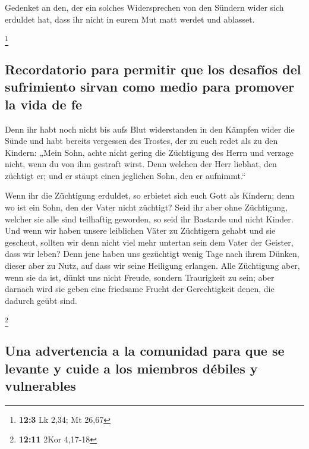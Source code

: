  Gedenket an den, der ein solches Widersprechen von den
Sündern wider sich erduldet hat, dass ihr nicht in eurem Mut matt werdet
und ablasset.

\footnote{\textbf{12:3} Lk 2,34; Mt 26,67}

\hypertarget{recordatorio-para-permitir-que-los-desafuxedos-del-sufrimiento-sirvan-como-medio-para-promover-la-vida-de-fe}{%
\subsection{Recordatorio para permitir que los desafíos del sufrimiento
sirvan como medio para promover la vida de
fe}\label{recordatorio-para-permitir-que-los-desafuxedos-del-sufrimiento-sirvan-como-medio-para-promover-la-vida-de-fe}}

 Denn ihr habt noch nicht bis aufs Blut widerstanden in
den Kämpfen wider die Sünde  und habt bereits vergessen
des Trostes, der zu euch redet als zu den Kindern: „Mein Sohn, achte
nicht gering die Züchtigung des Herrn und verzage nicht, wenn du von ihm
gestraft wirst.  Denn welchen der Herr liebhat, den
züchtigt er; und er stäupt einen jeglichen Sohn, den er aufnimmt.``

 Wenn ihr die Züchtigung erduldet, so erbietet sich euch
Gott als Kindern; denn wo ist ein Sohn, den der Vater nicht züchtigt?
 Seid ihr aber ohne Züchtigung, welcher sie alle sind
teilhaftig geworden, so seid ihr Bastarde und nicht Kinder.
 Und wenn wir haben unsere leiblichen Väter zu Züchtigern
gehabt und sie gescheut, sollten wir denn nicht viel mehr untertan sein
dem Vater der Geister, dass wir leben?  Denn jene haben
uns gezüchtigt wenig Tage nach ihrem Dünken, dieser aber zu Nutz, auf
dass wir seine Heiligung erlangen.  Alle Züchtigung aber,
wenn sie da ist, dünkt uns nicht Freude, sondern Traurigkeit zu sein;
aber darnach wird sie geben eine friedsame Frucht der Gerechtigkeit
denen, die dadurch geübt sind.

\footnote{\textbf{12:11} 2Kor 4,17-18}

\hypertarget{una-advertencia-a-la-comunidad-para-que-se-levante-y-cuide-a-los-miembros-duxe9biles-y-vulnerables}{%
\subsection{Una advertencia a la comunidad para que se levante y cuide a
los miembros débiles y
vulnerables}\label{una-advertencia-a-la-comunidad-para-que-se-levante-y-cuide-a-los-miembros-duxe9biles-y-vulnerables}}

